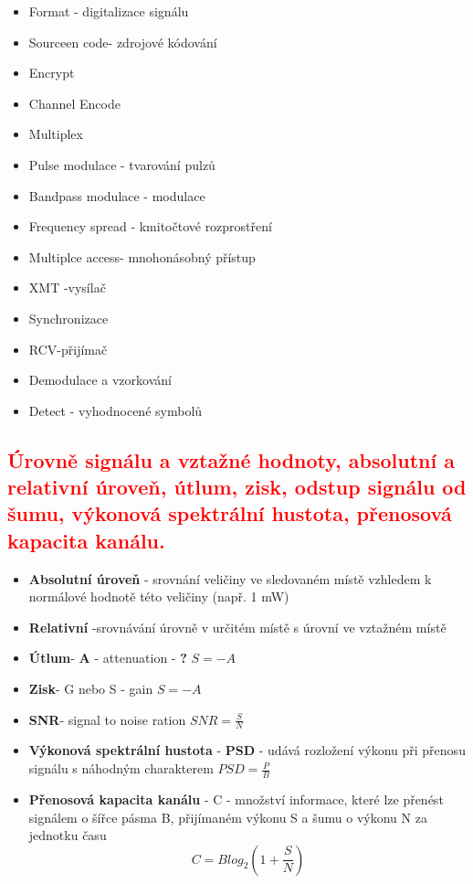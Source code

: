\begin{itemize}
    \item Format - digitalizace signálu
    \item Sourceen code- zdrojové kódování
    \item Encrypt
    \item Channel Encode
    \item Multiplex
    \item Pulse modulace - tvarování pulzů
    \item Bandpass modulace - modulace
    \item Frequency spread - kmitočtové rozprostření
    \item Multiplce access- mnohonásobný přístup
    \item XMT -vysílač
    \item Synchronizace
    \item RCV-přijímač
    \item Demodulace a vzorkování
    \item Detect - vyhodnocené symbolů
    
\end{itemize}


\subsection{\textcolor{red}{Úrovně signálu a vztažné hodnoty, absolutní a relativní úroveň, útlum, zisk, odstup signálu od šumu, výkonová spektrální hustota, přenosová kapacita kanálu.}}
\begin{itemize}
    \item \textbf{Absolutní úroveň} - srovnání veličiny ve sledovaném místě vzhledem k normálové hodnotě této veličiny (např. 1 mW)
    \item \textbf{Relativní} -srovnávání úrovně v určitém místě s úrovní ve vztažném místě
    \item \textbf{Útlum}- \textbf{A} - attenuation - \textbf{?} $S=-A$
    \item \textbf{Zisk}- G nebo S - gain $S=-A$
    \item \textbf{SNR}- signal to noise ration $SNR=\frac{S}{N}$
    \item \textbf{Výkonová spektrální hustota} - \textbf{PSD} - udává rozložení výkonu při přenosu signálu s náhodným charakterem 
    $PSD=\frac{P}{B}$
    \item \textbf{Přenosová kapacita kanálu} - C - množství informace, které lze přenést signálem o šířce pásma B, přijímaném výkonu S a šumu o výkonu N za jednotku času
    $$C=Blog_2(1+\frac{S}{N})$$
\end{itemize}

